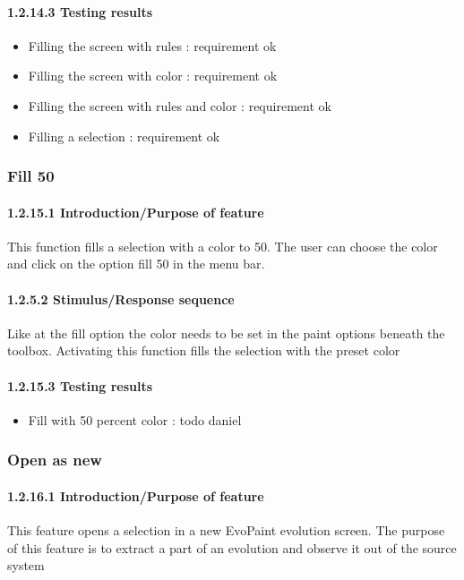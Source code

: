 \documentclass[titlepage,12pt]{scrartcl}
\begin{document}
\paragraph{1.2.14.3 Testing results}
\begin{itemize}
	\item Filling the screen with rules : requirement ok
	\item Filling the screen with color	: requirement ok
	\item Filling the screen with rules and color	: requirement ok
	\item Filling a selection : requirement ok
\end{itemize}

\subsubsection{Fill 50}
\paragraph{1.2.15.1 Introduction/Purpose of feature}
This function fills a selection with a color to 50. The user can choose the color and click on the option fill 50 in the menu bar.
\paragraph{1.2.5.2 Stimulus/Response sequence}
Like at the fill option the color needs to be set in the paint options beneath the toolbox. Activating this function fills the selection with the preset color
\paragraph{1.2.15.3 Testing results}
\begin{itemize}
	\item Fill with 50 percent color :	todo daniel
\end{itemize}

\subsubsection{Open as new}
\paragraph{1.2.16.1 Introduction/Purpose of feature}
This feature opens a selection in a new EvoPaint evolution screen. The purpose of this feature is to extract a part of an evolution and observe it out of the source system
\end{document}
